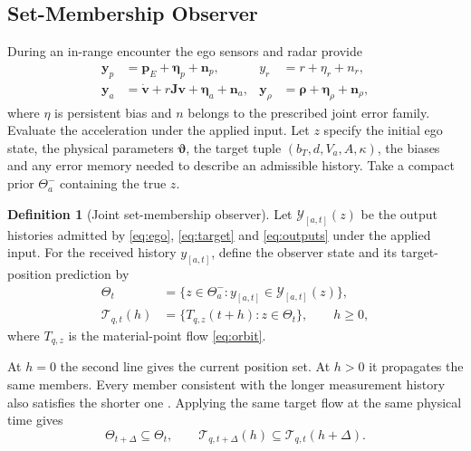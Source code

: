 \documentclass[journal]{IEEEtran}
\theoremstyle{definition}
\newtheorem{definition}{Definition}
\newcommand{\vct}[1]{\boldsymbol{#1}}
\newcommand{\mtx}[1]{\mathbf{#1}}
\begin{document}
\subsection{Set-Membership Observer}
During an in-range encounter the ego sensors and radar provide
\begin{equation}\label{eq:outputs}
\begin{aligned}
 \vct y_p&=\vct p_E+\vct\eta_p+\vct n_p,&
 y_r&=r+\eta_r+n_r,\\
 \vct y_a&=\dot{\vct v}+r\mtx J\vct v+\vct\eta_a+\vct n_a,&
 \vct y_\rho&=\vct\rho+\vct\eta_\rho+\vct n_\rho ,
\end{aligned}
\end{equation}
where $\eta$ is persistent bias and $n$ belongs to the prescribed
joint error family. Evaluate the acceleration under the applied input.
Let $z$ specify the initial ego state, the physical parameters
$\vct\vartheta$, the target tuple $(b_T,d,V_a,A,\kappa)$, the biases
and any error memory needed to describe an admissible history. Take a
compact prior $\Theta_a^-$ containing the true $z$.

\begin{definition}[Joint set-membership observer]\label{def:observer}
Let $\mathcal Y_{[a,t]}(z)$ be the output histories admitted by
\eqref{eq:ego}, \eqref{eq:target} and \eqref{eq:outputs} under the
applied input. For the received history $y_{[a,t]}$, define the
observer state and its target-position prediction by
\begin{equation}\label{eq:observer}
\begin{aligned}
 \Theta_t&=\{z\in\Theta_a^-:y_{[a,t]}\in\mathcal Y_{[a,t]}(z)\},\\
 \mathcal T_{q,t}(h)&=\{T_{q,z}(t+h):z\in\Theta_t\},\qquad h\ge0 ,
\end{aligned}
\end{equation}
where $T_{q,z}$ is the material-point flow \eqref{eq:orbit}.
\end{definition}
At $h=0$ the second line gives the current position set. At $h>0$ it
propagates the same members. Every member consistent with the longer
measurement history also satisfies the shorter one \cite{BertsekasRhodes1971}.
Applying the same target flow at the same physical time gives
\begin{equation}\label{eq:conditioning}
 \Theta_{t+\Delta}\subseteq\Theta_t,\qquad
 \mathcal T_{q,t+\Delta}(h)\subseteq\mathcal T_{q,t}(h+\Delta).
\end{equation}
\end{document}
